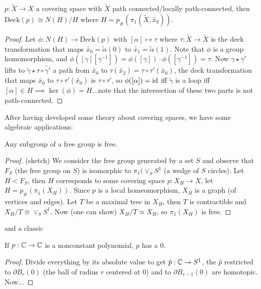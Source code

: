 \begin{boxtheorem}
    $p:\tilde{X}\rightarrow X$ a covering space with $\tilde{X}$ path connected/locally path-connected, then $\text{Deck}(p)\cong N(H)/H$ where $H=p_{\#}(\pi_1(\tilde{X}, \tilde{x_0}))$.
\end{boxtheorem}
\begin{proof}
    Let $\phi:N(H)\rightarrow\text{Deck}(p)$ with $[\alpha]\mapsto \tau$ where $\tau:\tilde{X}\rightarrow \tilde{X}$ is the deck transformation that maps $\tilde{x_0}=\tilde{\alpha}(0)$ to  $\tilde{x_1}=\tilde{\alpha}(1)$. Note that $\phi$ is a group homomorphism, and $\phi([\gamma][\gamma^{-1}])=\phi([\gamma])\cdot \phi([\gamma^{-1}])=\tau$. Now $\gamma \star \gamma'$ lifts to $\tilde{\gamma}\star \tau \circ \tilde{\gamma'}$ a path from $\tilde{x_0}$ to $\tau(\tilde{x_2})=\tau\circ \tau'(\tilde{x_0})$, the deck transformation that maps $\tilde{x_0}$ to $\tau \circ \tau'(\tilde{x_0})$ is $\tau \circ \tau'$, so $\phi([\alpha])=\operatorname{id}$ iff $\tilde{\gamma}$ is a loop iff $[\alpha]\in H\implies \ker(\phi)=H$...note that the intersection of these two parts is not path-connected.\sorry
\end{proof}

After having developed some theory about covering spaces, we have some algebraic applications:
\begin{boxtheorem}
    Any subgroup of a free group is free.
\end{boxtheorem}
\begin{proof}
    (sketch) We consider the free group generated by a set $S$ and observe that $F_S$ (the free group on $S$) is isomorphic to $\pi_1(\vee_S S^1$ (a wedge of $S$ circles). Let $H<F_S$, then $H$ corresponds to some covering space $p:X_H\rightarrow X$, let $H=p_{\#}(\pi_1(X_H))$. Since $p$ is a local homeomorphism, $X_H$ is a graph (of vertices and edges). Let $T$ be a maximal tree in $X_H$, then $T$ is contractible and $X_H/T\cong \vee_S S^1$. Now (one can show) $X_H/T\simeq X_H$, so $\pi_1(X_H)$ is free.
\end{proof}
and a classic
\begin{boxtheorem}
    If $p:\mathbb{C}\rightarrow \mathbb{C}$ is a nonconstant polynomial, $p$ has a 0.
\end{boxtheorem}
\begin{proof}
    Divide everything by its absolute value to get $\hat{p}:\mathbb{C}\rightarrow S^1$, the $\hat{p}$ restricted to $\partial B_r(0)$ (the ball of radius $r$ centered at 0) and to $\partial B_{r-1}(0)$ are homotopic. Now...\sorry
\end{proof}

